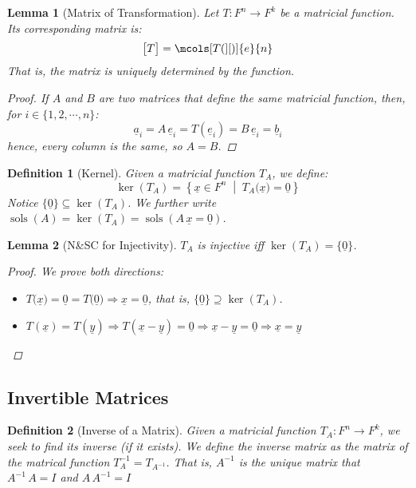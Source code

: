\documentclass[12pt]{article}
\let\RA\Rightarrow
\let\LA\Leftarrow
\newcommand{\set}[2]{\left\{{#1}\;\middle|\;{#2}\right\}}
\newcommand{\tuple}[1]{\underline{#1}}
\DeclareMathOperator{\sols}{sols}
\newtheorem{definition}{Definition}[subsection]
\newtheorem{lemma}{Lemma}[subsection]
\begin{document}
\begin{lemma}[Matrix of Transformation]
  Let $T: F^n\to F^k$ be a matricial function. Its corresponding matrix is:
  $$
  \big[T\big]=\mcols[T(][)]{e}{n}
  $$
  That is, the matrix is uniquely determined by the function.
  \begin{proof}
    If $A$ and $B$ are two matrices that define the same matricial function, then, for $i\in\{1,2,\cdots,n\}$:
    $$\tuple{a}_i=A\,\tuple{e}_i=T(\tuple{e}_i)=B\,\tuple{e}_i=\tuple{b}_i$$
    hence, every column is the same, so $A=B$.
  \end{proof}
\end{lemma}

\begin{definition}[Kernel]
  Given a matricial function $T_A$, we define:
  $$\ker(T_A)=\set{\tuple{x}\in F^n}{T_A\big(\tuple{x}\big)=\tuple{0}}$$
  Notice $\{\tuple{0}\}\subseteq \ker(T_A)$. We further write $\sols(A)=\ker(T_A)=\sols(A\,\tuple{x}=\tuple{0})$.
\end{definition}

\begin{lemma}[N\&SC for Injectivity]
  $T_A$ is injective iff $\ker(T_A)=\{\tuple{0}\}$.
  \begin{proof}
    We prove both directions:
    \begin{itemize}
      \item [$(\RA)$] $T\big(\tuple{x}\big)=\tuple{0}=T\big(\tuple{0}\big)\RA \tuple{x}=\tuple{0}$, that is, $\{\tuple{0}\}\supseteq \ker(T_A)$.
      \item [$(\LA)$] $T(\tuple{x})=T(\tuple{y})\RA T(\tuple{x}-\tuple{y})=\tuple{0}\RA \tuple{x}-\tuple{y}=\tuple{0}\RA \tuple{x}=\tuple{y}$
    \end{itemize}
  \end{proof}
\end{lemma}

\subsection{Invertible Matrices}

\begin{definition}[Inverse of a Matrix]
  Given a matricial function $T_A: F^n \to F^k$, we seek to find its inverse (if it exists). We define the inverse matrix as the matrix of the matrical function $T^{-1}_A=T_{A^{-1}}$. That is, $A^{-1}$ is the unique matrix that $A^{-1}\,A=I$ and $A\,A^{-1}=I$
\end{definition}
\end{document}
